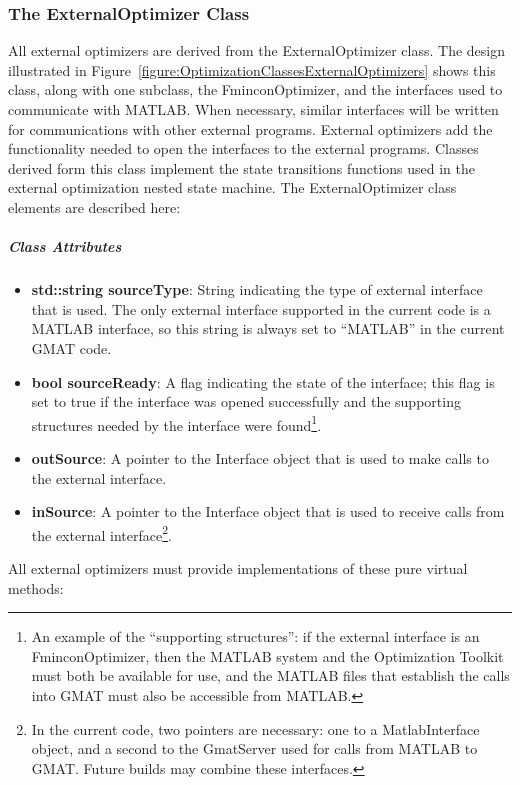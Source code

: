 \subsubsection{The ExternalOptimizer Class}

All external optimizers are derived from the ExternalOptimizer class.  The design illustrated in
Figure~\ref{figure:OptimizationClassesExternalOptimizers} shows this class, along with one
subclass, the FminconOptimizer, and the interfaces used to communicate with MATLAB.  When necessary,
similar interfaces will be written for communications with other external programs.  External
optimizers add the functionality needed to open the interfaces to the external programs.  Classes
derived form this class implement the state transitions functions used in the external optimization
nested state machine.  The ExternalOptimizer class elements are described here:

\subparagraph{\textit{Class Attributes}}
\begin{itemize}
\item \textbf{std::string sourceType}: String indicating the type of external interface that is
used. The only external interface supported in the current code is a MATLAB interface, so this
string is always set to ``MATLAB'' in the current GMAT code.
\item \textbf{bool sourceReady}: A flag indicating the state of the interface; this flag is set to
true if the interface was opened successfully and the supporting structures needed by the
interface were found\footnote{An example of the ``supporting structures'': if the external
interface is an FminconOptimizer, then the MATLAB system and the Optimization Toolkit must both be
available for use, and the MATLAB files that establish the calls into GMAT must also be accessible
from MATLAB.}.
\item \textbf{outSource}: A pointer to the Interface object that is used to make calls to the
external interface.
\item \textbf{inSource}: A pointer to the Interface object that is used to receive calls from the
external interface\footnote{In the current code, two pointers are necessary: one to a
MatlabInterface object, and a second to the GmatServer used for calls from MATLAB to GMAT.  Future
builds may combine these interfaces.}.
\end{itemize}

\noindent All external optimizers must provide implementations of these pure virtual methods:

